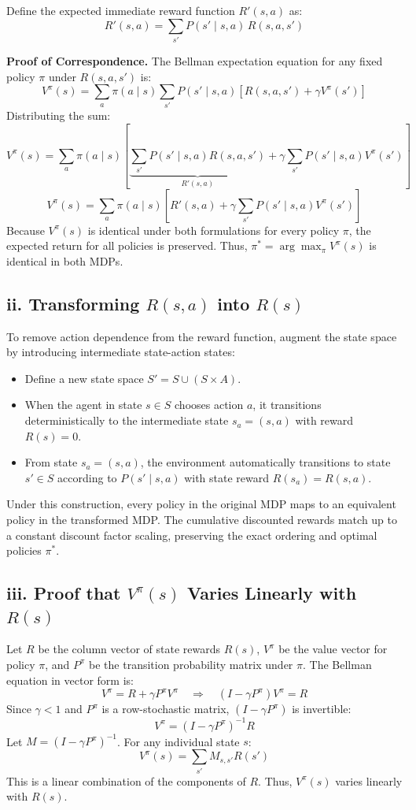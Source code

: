 \documentclass[11pt]{article}
\begin{document}
Define the expected immediate reward function $R'(s, a)$ as:
\[
R'(s, a) = \sum_{s'} P(s' \mid s, a)\, R(s, a, s')
\]

\textbf{Proof of Correspondence.} The Bellman expectation equation for any fixed policy
$\pi$ under $R(s, a, s')$ is:
\[
V^\pi(s) = \sum_{a} \pi(a \mid s) \sum_{s'} P(s' \mid s, a) \left[ R(s, a, s') + \gamma V^\pi(s') \right]
\]
Distributing the sum:
\[
V^\pi(s) = \sum_{a} \pi(a \mid s) \left[ \underbrace{\sum_{s'} P(s' \mid s, a) R(s, a, s')}_{R'(s, a)} + \gamma \sum_{s'} P(s' \mid s, a) V^\pi(s') \right]
\]
\[
V^\pi(s) = \sum_{a} \pi(a \mid s) \left[ R'(s, a) + \gamma \sum_{s'} P(s' \mid s, a) V^\pi(s') \right]
\]
Because $V^\pi(s)$ is identical under both formulations for every policy $\pi$, the expected
return for all policies is preserved. Thus, $\pi^* = \arg\max_\pi V^\pi(s)$ is identical in
both MDPs.

\subsection*{ii. Transforming $R(s, a)$ into $R(s)$}

To remove action dependence from the reward function, augment the state space by
introducing intermediate state-action states:
\begin{itemize}
  \item Define a new state space $S' = S \cup (S \times A)$.
  \item When the agent in state $s \in S$ chooses action $a$, it transitions
        deterministically to the intermediate state $s_a = (s, a)$ with reward $R(s) = 0$.
  \item From state $s_a = (s, a)$, the environment automatically transitions to state
        $s' \in S$ according to $P(s' \mid s, a)$ with state reward $R(s_a) = R(s, a)$.
\end{itemize}
Under this construction, every policy in the original MDP maps to an equivalent policy in
the transformed MDP. The cumulative discounted rewards match up to a constant discount
factor scaling, preserving the exact ordering and optimal policies $\pi^*$.

\subsection*{iii. Proof that $V^\pi(s)$ Varies Linearly with $R(s)$}

Let $R$ be the column vector of state rewards $R(s)$, $V^\pi$ be the value vector for
policy $\pi$, and $P^\pi$ be the transition probability matrix under $\pi$. The Bellman
equation in vector form is:
\[
V^\pi = R + \gamma P^\pi V^\pi
\quad\Longrightarrow\quad
(I - \gamma P^\pi) V^\pi = R
\]
Since $\gamma < 1$ and $P^\pi$ is a row-stochastic matrix, $(I - \gamma P^\pi)$ is
invertible:
\[
V^\pi = (I - \gamma P^\pi)^{-1} R
\]
Let $M = (I - \gamma P^\pi)^{-1}$. For any individual state $s$:
\[
V^\pi(s) = \sum_{s'} M_{s, s'} R(s')
\]
This is a linear combination of the components of $R$. Thus, $V^\pi(s)$ varies linearly
with $R(s)$.
\end{document}
